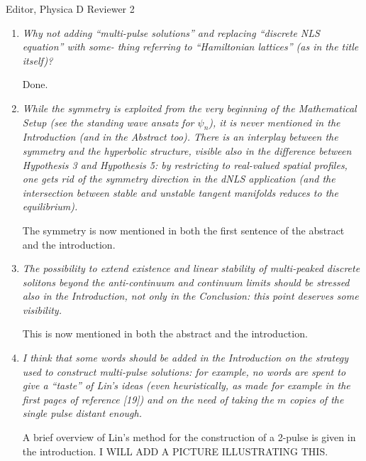 \documentclass[11pt]{letter}
\begin{document}
\begin{letter}{Editor, Physica D}
Reviewer 2
\begin{enumerate}
\item \emph{Why not adding ``multi-pulse solutions'' and replacing ``discrete NLS equation'' with some- thing referring to ``Hamiltonian lattices'' (as in the title itself)? }

\vspace{4mm}
Done.
\vspace{4mm}

\item \emph{While the symmetry is exploited from the very beginning of the Mathematical Setup (see the standing wave ansatz for $\psi_n$), it is never mentioned in the Introduction (and in the Abstract too). There is an interplay between the symmetry and the hyperbolic structure, visible also in the difference between Hypothesis 3 and Hypothesis 5: by restricting to real-valued spatial profiles, one gets rid of the symmetry direction in the dNLS application (and the intersection between stable and unstable tangent manifolds reduces to the equilibrium).}

\vspace{4mm}
The symmetry is now mentioned in both the first sentence of the abstract and the introduction.
\vspace{4mm}

\item \emph{The possibility to extend existence and linear stability of multi-peaked discrete solitons beyond the anti-continuum and continuum limits should be stressed also in the Introduction, not only in the Conclusion: this point deserves some visibility.}

\vspace{4mm}
This is now mentioned in both the abstract and the introduction.
\vspace{4mm}

\item \emph{I think that some words should be added in the Introduction on the strategy used to construct multi-pulse solutions: for example, no words are spent to give a “taste” of Lin’s ideas (even heuristically, as made for example in the first pages of reference [19]) and on the need of taking the $m$ copies of the single pulse distant enough.}

\vspace{4mm}
A brief overview of Lin's method for the construction of a 2-pulse is given in the introduction. I WILL ADD A PICTURE ILLUSTRATING THIS.
\vspace{4mm}


\end{enumerate}
\end{letter}
\end{document}
